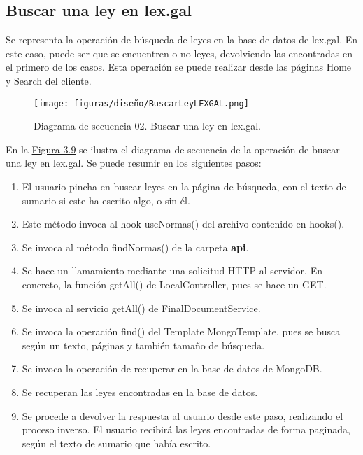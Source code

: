 \subsection{Buscar una ley en lex.gal}

Se representa la operación de búsqueda de leyes en la base de datos de lex.gal. En este caso, puede ser que se encuentren o no leyes, devolviendo las encontradas en el primero de los casos. Esta operación se puede realizar desde las páginas Home y Search del cliente.

\begin{figure}[H]
\centerline{\texttt{[image: figuras/diseño/BuscarLeyLEXGAL.png]}}
\caption{Diagrama de secuencia 02. Buscar una ley en lex.gal.}
\label{enlaceDBuscar}
\end{figure}

En la \hyperref[enlaceDRegistro]{Figura 3.9} se ilustra el diagrama de secuencia de la operación de buscar una ley en lex.gal. Se puede resumir en los siguientes pasos:

\begin{enumerate}
    \item El usuario pincha en buscar leyes en la página de búsqueda, con el texto de sumario si este ha escrito algo, o sin él.
    \item Este método invoca al hook useNormas() del archivo contenido en hooks().
    \item Se invoca al método findNormas() de la carpeta {\bf api}.
    \item Se hace un llamamiento mediante una solicitud HTTP al servidor. En concreto, la función getAll() de LocalController, pues se hace un GET.
    \item Se invoca al servicio getAll() de FinalDocumentService.
    \item Se invoca la operación find() del Template MongoTemplate, pues se busca según un texto, páginas y también tamaño de búsqueda.
    \item Se invoca la operación de recuperar en la base de datos de MongoDB.
    \item Se recuperan las leyes encontradas en la base de datos.
    \item Se procede a devolver la respuesta al usuario desde este paso, realizando el proceso inverso. El usuario recibirá las leyes encontradas de forma paginada, según el texto de sumario que había escrito.
\end{enumerate}
